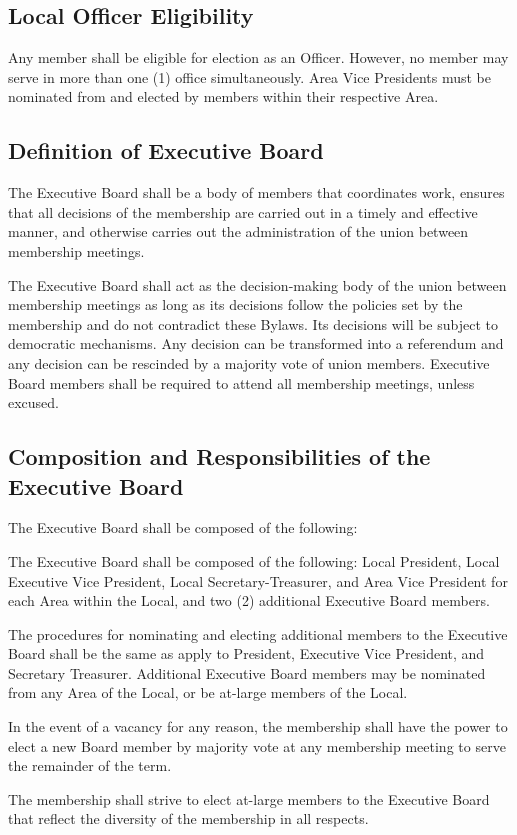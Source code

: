 \documentclass[11pt]{article}
\newcommand{\articlesection}[1]{\vspace{.25cm}\subsection{#1}}
\begin{document}
\articlesection{Local Officer Eligibility}
Any member shall be eligible for election as an Officer. However, no member may serve in more than one (1) office simultaneously. Area Vice Presidents must be nominated from and elected by members within their respective Area.

\articlesection{Definition of Executive Board}
\begin{paralist}
  \item The Executive Board shall be a body of members that coordinates work, ensures that all decisions of the membership are carried out in a timely and effective manner, and otherwise carries out the administration of the union between membership meetings.
  \item The Executive Board shall act as the decision-making body of the union between membership meetings as long as its decisions follow the policies set by the membership and do not contradict these Bylaws. Its decisions will be subject to democratic mechanisms. Any decision can be transformed into a referendum and any decision can be rescinded by a majority vote of union members. Executive Board members shall be required to attend all membership meetings, unless excused.
\end{paralist}

\articlesection{Composition and Responsibilities of the Executive Board}
The Executive Board shall be composed of the following:
\begin{paralist}
  \item The Executive Board shall be composed of the following: Local President, Local Executive Vice President, Local Secretary-Treasurer, and Area Vice President for each Area within the Local, and two (2) additional Executive Board members.
  \item The procedures for nominating and electing additional members to the Executive Board shall be the same as apply to President, Executive Vice President, and Secretary Treasurer. Additional Executive Board members may be nominated from any Area of the Local, or be at-large members of the Local.
  \item In the event of a vacancy for any reason, the membership shall have the power to elect a new Board member by majority vote at any membership meeting to serve the remainder of the term.
  \item The membership shall strive to elect at-large members to the Executive Board that reflect the diversity of the membership in all respects.
\end{paralist}
\end{document}
